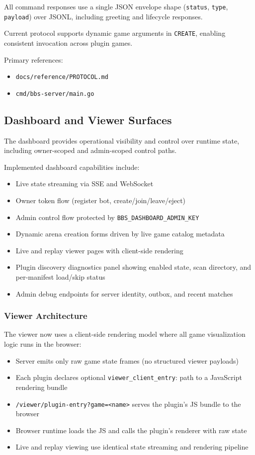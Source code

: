 \documentclass[11pt]{article}
\begin{document}
All command responses use a single JSON envelope shape (\texttt{status}, \texttt{type}, \texttt{payload}) over JSONL, including greeting and lifecycle responses.

Current protocol supports dynamic game arguments in \texttt{CREATE}, enabling consistent invocation across plugin games.

Primary references:
\begin{itemize}[leftmargin=*]
  \item \texttt{docs/reference/PROTOCOL.md}
  \item \texttt{cmd/bbs-server/main.go}
\end{itemize}

\subsection{Dashboard and Viewer Surfaces}
The dashboard provides operational visibility and control over runtime state, including owner-scoped and admin-scoped control paths.

Implemented dashboard capabilities include:
\begin{itemize}[leftmargin=*]
  \item Live state streaming via SSE and WebSocket
  \item Owner token flow (register bot, create/join/leave/eject)
  \item Admin control flow protected by \texttt{BBS\_DASHBOARD\_ADMIN\_KEY}
  \item Dynamic arena creation forms driven by live game catalog metadata
  \item Live and replay viewer pages with client-side rendering
  \item Plugin discovery diagnostics panel showing enabled state, scan directory, and per-manifest load/skip status
  \item Admin debug endpoints for server identity, outbox, and recent matches
\end{itemize}

\subsubsection{Viewer Architecture}
The viewer now uses a client-side rendering model where all game visualization logic runs in the browser:
\begin{itemize}[leftmargin=*]
  \item Server emits only raw game state frames (no structured viewer payloads)
  \item Each plugin declares optional \texttt{viewer\_client\_entry}: path to a JavaScript rendering bundle
  \item \texttt{/viewer/plugin-entry?game=<name>} serves the plugin's JS bundle to the browser
  \item Browser runtime loads the JS and calls the plugin's renderer with raw state
  \item Live and replay viewing use identical state streaming and rendering pipeline
\end{itemize}
\end{document}
